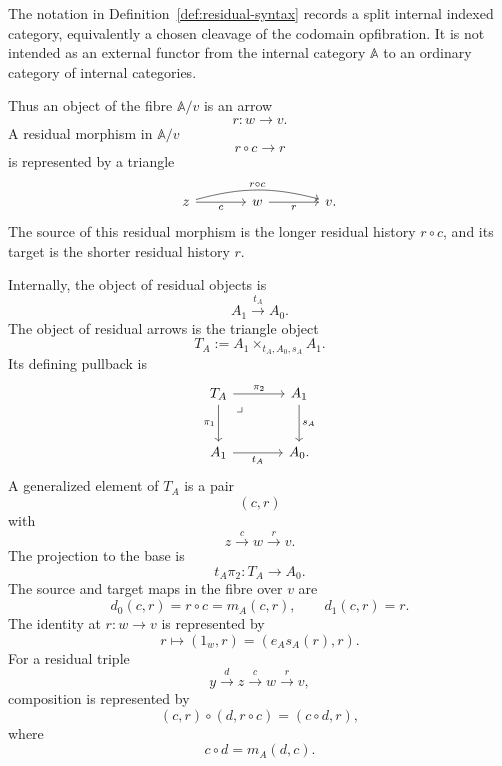 The notation in Definition~\ref{def:residual-syntax} records a split internal indexed category, equivalently a chosen cleavage of the codomain opfibration. It is not intended as an external functor from the internal category \(\mathbb A\) to an ordinary category of internal categories.

Thus an object of the fibre \(\mathbb A/v\) is an arrow
\[
    r:w\to v.
\]
A residual morphism in \(\mathbb A/v\)
\[
    r\circ c\to r
\]
is represented by a triangle
\[
    \begin{tikzcd}[column sep=large, row sep=large]
            z
                \arrow[rr, "r\circ c", bend left=15]
                \arrow[r, "c"']
        &
            w
                \arrow[r, "r"']
        &
            v.
\end{tikzcd}
\]
The source of this residual morphism is the longer residual history \(r\circ c\), and its target is the shorter residual history \(r\).

Internally, the object of residual objects is
\[
    A_1\xrightarrow{t_A}A_0.
\]
The object of residual arrows is the triangle object
\[
    T_A:=A_1\times_{t_A,A_0,s_A}A_1.
\]
Its defining pullback is
\[
    \begin{tikzcd}[column sep=large, row sep=large]
            T_A
                \arrow[r, "\pi_2"]
                \arrow[d, "\pi_1"']
                \arrow[dr, phantom, "\lrcorner", very near start]
        &
            A_1
                \arrow[d, "s_A"]
        \\
            A_1
                \arrow[r, "t_A"']
        &
            A_0.
    \end{tikzcd}
\]
A generalized element of \(T_A\) is a pair
\[
    (c,r)
\]
with
\[
    z\xrightarrow{c}w\xrightarrow{r}v.
\]
The projection to the base is
\[
    t_A\pi_2:T_A\to A_0.
\]
The source and target maps in the fibre over \(v\) are
\[
    d_0(c,r)=r\circ c=m_A(c,r),
    \qquad
    d_1(c,r)=r.
\]
The identity at \(r:w\to v\) is represented by
\[
    r\longmapsto (1_w,r)=(e_As_A(r),r).
\]
For a residual triple
\[
    y\xrightarrow{d}z\xrightarrow{c}w\xrightarrow{r}v,
\]
composition is represented by
\[
    (c,r)\circ(d,r\circ c)=(c\circ d,r),
\]
where
\[
    c\circ d=m_A(d,c).
\]

